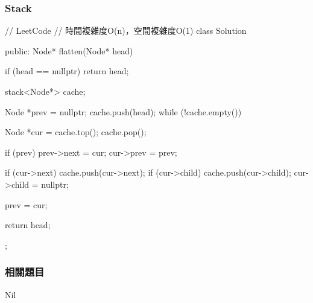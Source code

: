 \subsubsection{Stack}
\begin{Code}
// LeetCode
// 時間複雜度O(n)，空間複雜度O(1)
class Solution {
public:
    Node* flatten(Node* head) {
        if (head == nullptr) return head;

        stack<Node*> cache;

        Node *prev = nullptr;
        cache.push(head);
        while (!cache.empty()) {
            Node *cur = cache.top();
            cache.pop();

            if (prev)
                prev->next = cur;
            cur->prev = prev;

            if (cur->next) cache.push(cur->next);
            if (cur->child) cache.push(cur->child);
            cur->child = nullptr;

            prev = cur;
        }

        return head;
    }
};
\end{Code}

\subsubsection{相關題目}

\begindot
\item Nil
\myenddot
